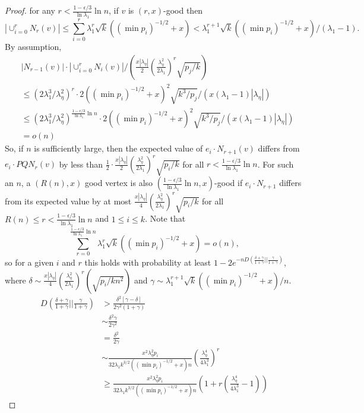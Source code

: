 \documentclass[11pt]{article}
\newcommand{\1}{\mathbb{1}}
\begin{document}
\begin{proof}
for any $r<\frac{1-\epsilon/3}{\ln\lambda_1}\ln n$, if $v$ is $(r,x)$-good then $$|\cup_{i=0}^r N_r(v)|\le\sum_{i=0}^r  \lambda_1^r\sqrt{k}((\min p_i)^{-1/2}+x)<\lambda_1^{r+1}\sqrt{k}((\min p_i)^{-1/2}+x)/(\lambda_1-1).$$ By assumption, 
\begin{align*}
&|N_{r-1}(v)|\cdot|\cup_{i=0}^r N_i(v)|/\left(\frac{x|\lambda_{\eta}|}{2}\left(\frac{\lambda_{\eta}^2}{2\lambda_1}\right)^{r}\sqrt{p_j/k}\right)\\
&\le (2\lambda_1^3/\lambda_{\eta}^2)^{r}\cdot 2((\min p_i)^{-1/2}+x)^2\sqrt{k^3/p_j}/(x(\lambda_1-1)|\lambda_{\eta}|)\\ 
&\le (2\lambda_1^3/\lambda_{\eta}^2)^{\frac{1-\epsilon/3}{\ln\lambda_1}\ln n}\cdot 2((\min p_i)^{-1/2}+x)^2\sqrt{k^3/p_j}/(x(\lambda_1-1)|\lambda_{\eta}|)\\
&=o(n)
\end{align*}
So, if $n$ is sufficiently large, then the expected value of $e_i\cdot N_{r+1}(v)$ differs from $e_i\cdot PQN_r(v)$ by less than $\frac{1}{2}\cdot\frac{x|\lambda_{\eta}|}{2}(\frac{\lambda_{\eta}^2}{2\lambda_1})^{r}\sqrt{p_i/k}$ for all $r<\frac{1-\epsilon/3}{\ln\lambda_1}\ln n$. For such an $n$, a $(R(n),x)$ good vertex is also $(\frac{1-\epsilon/3}{\ln\lambda_1}\ln n,x)$-good if $e_i\cdot N_{r+1}$ differs from its expected value by at most $\frac{x|\lambda_{\eta}|}{4}(\frac{\lambda_{\eta}^2}{2\lambda_1})^{r}\sqrt{p_i/k}$ for all $R(n)\le r<\frac{1-\epsilon/3}{\ln\lambda_1}\ln n$ and $1\le i\le k$. Note that $$\sum_{r=0}^{\frac{1-\epsilon/3}{\ln\lambda_1}\ln n} \lambda_1^r\sqrt{k}((\min p_i)^{-1/2}+x)=o(n),$$ so for a given $i$ and $r$ this holds with probability at least   $1-2e^{-nD(\frac{\delta+\gamma}{1+\gamma}||\frac{\gamma}{1+\gamma})}$, where $\delta\sim \frac{x|\lambda_{\eta}|}{4}(\frac{\lambda_{\eta}^2}{2\lambda_1})^{r}(\sqrt{p_i/kn^2})$ and $\gamma\sim \lambda_1^{r+1}\sqrt{k}((\min p_i)^{-1/2}+x)/n$. 
\begin{align*}
D\left(\frac{\delta+\gamma}{1+\gamma}||\frac{\gamma}{1+\gamma}\right)&>\frac{\delta^2[\gamma-\delta]}{2\gamma^2(1+\gamma)}\\
&\sim \frac{\delta^2\gamma}{2\gamma^2}\\
&=\frac{\delta^2}{2\gamma}\\
&\sim \frac{x^2\lambda_{\eta}^2p_i}{32\lambda_1k^{3/2}((\min p_i)^{-1/2}+x)n}\left(\frac{\lambda_{\eta}^4}{4\lambda_1^3}\right)^{r}\\
&\ge \frac{x^2\lambda_{\eta}^2p_i}{32\lambda_1k^{3/2}((\min p_i)^{-1/2}+x)n}\left(1+r\left(\frac{\lambda_{\eta}^4}{4\lambda_1^3}-1\right)\right)

\end{align*}
\end{proof}
\end{document}
